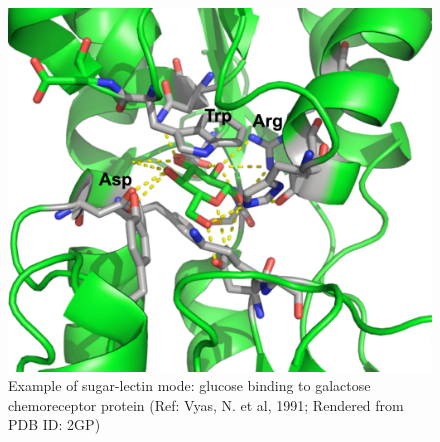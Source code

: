 \begin{figure}
  \centering
  \includegraphics[width=6in]{figures/introduction/sugar_protein_binding.pdf}
  \caption[Sugar protein example]{Example of sugar-lectin mode: glucose binding to galactose chemoreceptor protein (Ref: Vyas, N. et al, 1991; Rendered from PDB ID: 2GP)}
  \label{fig:sugar_protein}
\end{figure}





